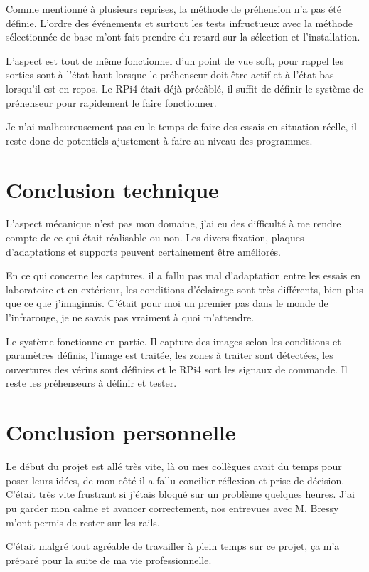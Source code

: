 Comme mentionné à plusieurs reprises, la méthode de préhension n'a pas été définie. L'ordre des événements et surtout les tests infructueux avec la méthode sélectionnée de base
m'ont fait prendre du retard sur la sélection et l'installation.

L'aspect est tout de même fonctionnel d'un point de vue soft, pour rappel les sorties sont à l'état haut lorsque le préhenseur doit être actif et à l'état bas lorsqu'il est en repos.
Le RPi4 était déjà précâblé, il suffit de définir le système de préhenseur pour rapidement le faire fonctionner.

Je n'ai malheureusement pas eu le temps de faire des essais en situation réelle, il reste donc de potentiels ajustement à faire au niveau des programmes.

\section{Conclusion technique}
L'aspect mécanique n'est pas mon domaine, j'ai eu des difficulté à me rendre compte de ce qui était réalisable ou non.
Les divers fixation, plaques d'adaptations et supports peuvent certainement être améliorés.

En ce qui concerne les captures, il a fallu pas mal d'adaptation entre les essais en laboratoire et en extérieur, les conditions d'éclairage sont très différents,
bien plus que ce que j'imaginais. C'était pour moi un premier pas dans le monde de l'infrarouge, je ne savais pas vraiment à quoi m'attendre.

Le système fonctionne en partie. Il capture des images selon les conditions et paramètres définis, l'image est traitée, les zones à traiter sont détectées,
les ouvertures des vérins sont définies et le RPi4 sort les signaux de commande. Il reste les préhenseurs à définir et tester.
\section{Conclusion personnelle}
Le début du projet est allé très vite, là ou mes collègues avait du temps pour poser leurs idées, de mon côté il a fallu concilier réflexion et prise de décision.
C'était très vite frustrant si j'étais bloqué sur un problème quelques heures. J'ai pu garder mon calme et avancer correctement, nos entrevues avec M. Bressy m'ont permis de rester sur les rails.

C'était malgré tout agréable de travailler à plein temps sur ce projet, ça m'a préparé pour la suite de ma vie professionnelle.
